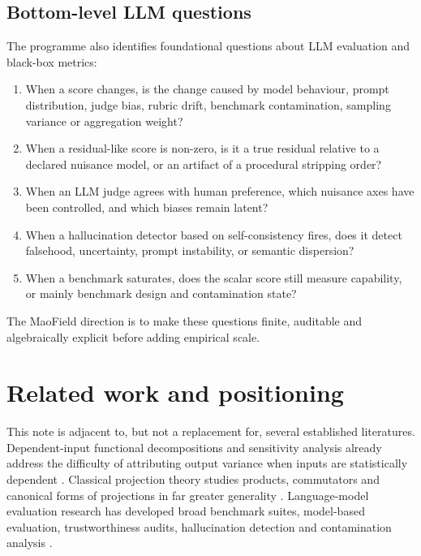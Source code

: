 \documentclass[11pt]{article}
\theoremstyle{remark}
\begin{document}
\subsection{Bottom-level LLM questions}

The programme also identifies foundational questions about LLM evaluation and black-box metrics:
\begin{enumerate}[leftmargin=*,itemsep=2pt]
\item When a score changes, is the change caused by model behaviour, prompt distribution, judge bias, rubric drift, benchmark contamination, sampling variance or aggregation weight?
\item When a residual-like score is non-zero, is it a true residual relative to a declared nuisance model, or an artifact of a procedural stripping order?
\item When an LLM judge agrees with human preference, which nuisance axes have been controlled, and which biases remain latent?
\item When a hallucination detector based on self-consistency fires, does it detect falsehood, uncertainty, prompt instability, or semantic dispersion?
\item When a benchmark saturates, does the scalar score still measure capability, or mainly benchmark design and contamination state?
\end{enumerate}
The MaoField direction is to make these questions finite, auditable and algebraically explicit before adding empirical scale.

\section{Related work and positioning}

This note is adjacent to, but not a replacement for, several established literatures. Dependent-input functional decompositions and sensitivity analysis already address the difficulty of attributing output variance when inputs are statistically dependent \cite{hooker2007,chastaing2012,chastaing2015,owenprieur2017,ioossprieur2019,ilidrissi2025,lamboni2026}. Classical projection theory studies products, commutators and canonical forms of projections in far greater generality \cite{halmos1969,boettcherspitkovsky2010,corachmaestripieri2010}. Language-model evaluation research has developed broad benchmark suites, model-based evaluation, trustworthiness audits, hallucination detection and contamination analysis \cite{bigbench2022,helm2022,truthfulqa2021,selfcheckgpt2023,geval2023,mtbench2023,decodingtrust2023,llmevalsurvey2023,contamination2024,rethinkingcontamination2023}.
\end{document}
